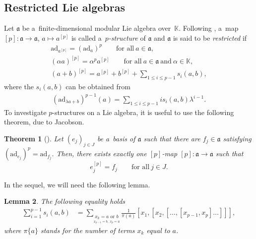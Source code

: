 \documentclass[pdftex]{sigma}
\numberwithin{equation}{section}
\newtheorem{Theorem}{Theorem}[section]
\newtheorem{Lemma}[Theorem]{Lemma}
\begin{document}
\subsection{Restricted Lie algebras}%
Let $\mathfrak{a}$ be a~finite-dimensional modular Lie algebra over~$\mathbb{K}$. Following \cite{J, SF}, a~map $[p]\colon \mathfrak{a}\rightarrow \mathfrak{a}$, $a\mapsto a^{[p]}$ is called a~\textit{$p$-structure} of $\mathfrak{a}$ and $\mathfrak{a}$ is said to be {\it restricted} if
\begin{gather*}
\mathrm{ad}_{a^{[p]}}=(\mathrm{ad}_a)^p \qquad \text{for all} \ a \in \mathfrak{a},\\
(\alpha a)^{[p]}=\alpha^p a^{[p]}\qquad \text{for all}\ a\in \mathfrak{a} \ \text{and} \ \alpha \in \mathbb{K},\\
(a+b)^{[p]}=a^{[p]}+b^{[p]}+\sum_{1\leq i\leq p-1}s_i(a,b),
\end{gather*}
where the $s_i(a,b)$ can be obtained from
\begin{gather*}%
(\mathrm{ad}_{\lambda a+b})^{p-1}(a)= \sum_{1\leq i \leq p-1} is_i(a,b) \lambda^{i-1}.
\end{gather*}
To investigate $p$-structures on a Lie algebra, it is useful to use the following theorem, due to Jacobson.
\begin{Theorem}[\cite{J}] \label{Jac}
Let $(e_j)_{j\in J}$ be a~basis of $\mathfrak{a}$ such that there are $f_j\!\!\in \!\mathfrak{a}$ satisfying ${(\mathrm{ad}_{e_j})^p\!=\!\mathrm{ad}_{f_j}}$. Then, there exists exactly one $[p]$-map $[p]\colon\mathfrak{a}\rightarrow \mathfrak{a}$ such that
\[
e_j^{[p]}=f_j \qquad \text{for all}\ j\in J.
\]
\end{Theorem}
In the sequel, we will need the following lemma.
\begin{Lemma}\label{1lemma}
The following equality holds
\begin{align*}\label{si}
\sum_{i=1}^{p-1}s_i(a,b)&=\sum_{\underset{x_{p-1}=b,~x_p=a}{x_k=a \text{ or } b}}\frac{1}{\pi(a)}[x_1,[x_2,[\dots ,[x_{p-1},x_p]\dots ]]],
\end{align*}
where $\pi\{a\}$ stands for the number of terms $x_k$ equal to $a$.
\end{Lemma}
\end{document}
